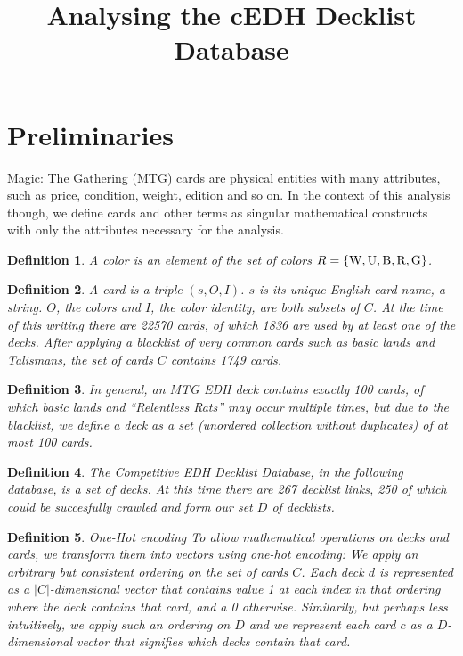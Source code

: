 \documentclass[a4]{article}
\title{Analysing the cEDH Decklist Database}
\newtheorem{definition}{Definition}
\begin{document}
\maketitle
\section{Preliminaries}
Magic: The Gathering (MTG) cards are physical entities with many attributes, such as price, condition, weight, edition and so on.
In the context of this analysis though, we define cards and other terms as singular mathematical constructs with only the attributes necessary for the analysis.

\begin{definition}%
A \emph{color} is an element of the set of \emph{colors} $R = \{\textnormal{W},\textnormal{U},\textnormal{B},\textnormal{R}, \textnormal{G}\}$.
\end{definition}

\begin{definition}%
A \emph{card} is a triple $(s,O,I)$.
$s$ is its unique English card name, a string.
$O$, the colors and $I$, the color identity, are both subsets of $C$.
At the time of this writing there are 22570 cards, of which 1836 are used by at least one of the decks.
After applying a blacklist of very common cards such as basic lands and Talismans, the set of cards $C$ contains 1749 cards.
\end{definition}

\begin{definition}%
In general, an MTG EDH \emph{deck} contains exactly 100 cards, of which basic lands and \enquote{Relentless Rats} may occur multiple times, but due to the blacklist,
 we define a \emph{deck} as a set (unordered collection without duplicates) of at most 100 cards.
\end{definition}

\begin{definition}%
The Competitive EDH Decklist Database, in the following \emph{database}, is a set of decks.
At this time there are 267 decklist links, 250 of which could be succesfully crawled and form our set $D$ of decklists.
\end{definition}

\begin{definition}{One-Hot encoding}
To allow mathematical operations on decks and cards, we transform them into vectors using \emph{one-hot encoding}:
We apply an arbitrary but consistent ordering on the set of cards $C$.
Each deck $d$ is represented as a $|C|$-dimensional vector that contains value 1 at each index in that ordering where the deck contains that card, and a 0 otherwise.
Similarily, but perhaps less intuitively, we apply such an ordering on $D$ and we represent each card $c$ as a $D$-dimensional vector that signifies which decks contain that card.
\end{definition}
\end{document}
